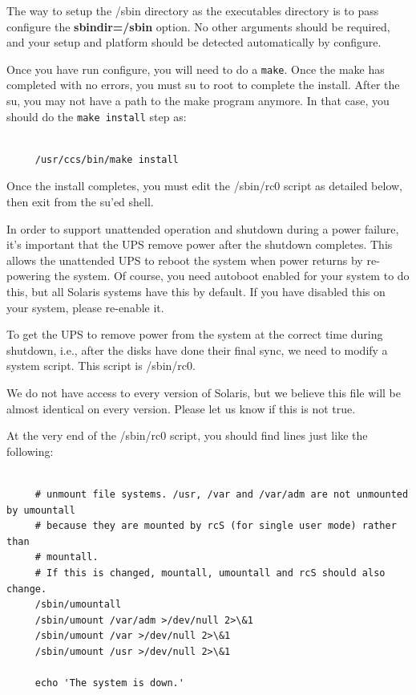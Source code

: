 The way to setup the /sbin directory as the executables directory is to pass
configure the {\bf sbindir=/sbin} option. No other arguments should be
required, and your setup and platform should be detected automatically by
configure.  

Once you have run configure, you will need to do a {\tt make}.  Once the make
has completed with no errors, you must su to root to complete the install.
After the su, you may not have a path to the make program anymore. In that
case, you should do the {\tt make install} step as: 

\footnotesize
\begin{verbatim}
     
     /usr/ccs/bin/make install
\end{verbatim}
\normalsize

Once the install completes, you must edit the /sbin/rc0 script as detailed
below, then exit from the su'ed shell.  

In order to support unattended operation and shutdown during a power failure,
it's important that the UPS remove power after the shutdown completes. This
allows the unattended UPS to reboot the system when power returns by
re-powering the system. Of course, you need autoboot enabled for your system
to do this, but all Solaris systems have this by default. If you have disabled
this on your system, please re-enable it.  

To get the UPS to remove power from the system at the correct time during
shutdown, i.e., after the disks have done their final sync, we need to modify
a system script. This script is /sbin/rc0.  

We do not have access to every version of Solaris, but we believe this file
will be almost identical on every version. Please let us know if this is not
true.  

At the very end of the /sbin/rc0 script, you should find lines just like the
following: 

\footnotesize
\begin{verbatim}
     
     # unmount file systems. /usr, /var and /var/adm are not unmounted by umountall
     # because they are mounted by rcS (for single user mode) rather than
     # mountall.
     # If this is changed, mountall, umountall and rcS should also change.
     /sbin/umountall
     /sbin/umount /var/adm >/dev/null 2>\&1
     /sbin/umount /var >/dev/null 2>\&1
     /sbin/umount /usr >/dev/null 2>\&1
     
     echo 'The system is down.'
\end{verbatim}
\normalsize


